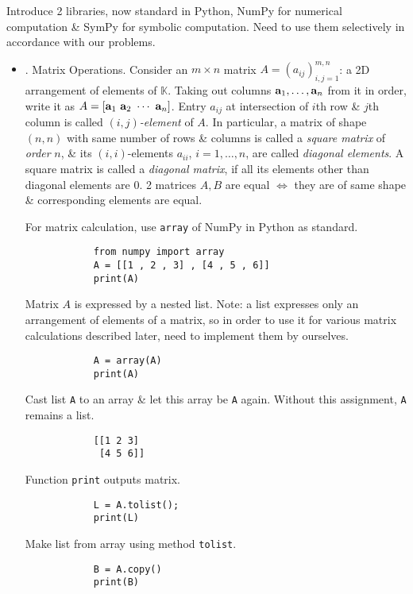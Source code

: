\documentclass{article}
\begin{document}
\begin{itemize}
	Introduce 2 libraries, now standard in Python, NumPy for numerical computation \& SymPy for symbolic computation. Need to use them selectively in accordance with our problems.
	\begin{itemize}
		\item {. Matrix Operations.} Consider an $m\times n$ matrix $A = (a_{ij})_{i,j=1}^{m,n}$: a 2D arrangement of elements of $\mathbb{K}$. Taking out columns ${\bf a}_1,\ldots,{\bf a}_n$ from it in order, write it as $A = [{\bf a}_1\ {\bf a}_2\ \cdots\ {\bf a}_n]$. Entry $a_{ij}$ at intersection of $i$th row \& $j$th column is called {\it$(i,j)$-element} of $A$. In particular, a matrix of shape $(n,n)$ with same number of rows \& columns is called a {\it square matrix} of {\it order} $n$, \& its $(i,i)$-elements $a_{ii}$, $i = 1,\ldots,n$, are called {\it diagonal elements}. A square matrix is called a {\it diagonal matrix}, if all its elements other than diagonal elements are 0. 2 matrices $A,B$ are equal $\Leftrightarrow$ they are of same shape \& corresponding elements are equal.
		
		For matrix calculation, use {\tt array} of NumPy in Python as standard.
		\begin{verbatim}
			from numpy import array
			A = [[1 , 2 , 3] , [4 , 5 , 6]]
			print(A)
		\end{verbatim}
		Matrix $A$ is expressed by a nested list. Note: a list expresses only an arrangement of elements of a matrix, so in order to use it for various matrix calculations described later, need to implement them by ourselves.
		\begin{verbatim}
			A = array(A)
			print(A)
		\end{verbatim}
		Cast list {\tt A} to an array \& let this array be {\tt A} again. Without this assignment, {\tt A} remains a list.
		\begin{verbatim}
			[[1 2 3]
			 [4 5 6]]
		\end{verbatim}
		Function {\tt print} outputs matrix.
		\begin{verbatim}
			L = A.tolist();
			print(L)
		\end{verbatim}
		Make list from array using method {\tt tolist}.
		\begin{verbatim}
			B = A.copy()
			print(B)
			

\end{verbatim}
\end{itemize}
\end{itemize}
\end{document}
